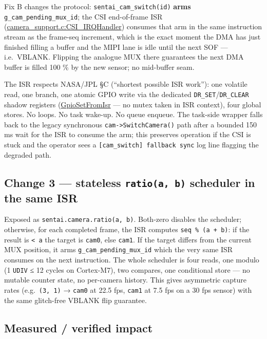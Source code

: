 Fix B changes the protocol: \texttt{sentai\_cam\_switch(id)}
\textbf{arms} \texttt{g\_cam\_pending\_mux\_id}; the CSI end-of-frame
ISR
(\href{../../../libs/camera/camera_support.c}{camera\_support.c:CSI\_IRQHandler})
consumes that arm in the same instruction stream as the frame-seq
increment, which is the exact moment the DMA has just finished filling a
buffer and the MIPI lane is idle until the next SOF --- i.e.~VBLANK.
Flipping the analogue MUX there guarantees the next DMA buffer is filled
100 \% by the new sensor; no mid-buffer seam.

The ISR respects NASA/JPL §C (``shortest possible ISR work''): one
volatile read, one branch, one atomic GPIO write via the dedicated
\texttt{DR\_SET}/\texttt{DR\_CLEAR} shadow registers
(\href{../../../libs/base/gpio.cc}{GpioSetFromIsr} --- no mutex taken in
ISR context), four global stores. No loops. No task wake-up. No queue
enqueue. The task-side wrapper falls back to the legacy synchronous
\texttt{cam-\textgreater{}SwitchCamera()} path after a bounded 150 ms
wait for the ISR to consume the arm; this preserves operation if the CSI
is stuck and the operator sees a
\texttt{{[}cam\_switch{]}\ fallback\ sync} log line flagging the
degraded path.

\subsection{\texorpdfstring{Change 3 --- stateless \texttt{ratio(a,\ b)}
scheduler in the same
ISR}{Change 3 --- stateless ratio(a, b) scheduler in the same ISR}}\label{change-3-stateless-ratioa-b-scheduler-in-the-same-isr}

Exposed as \texttt{sentai.camera.ratio(a,\ b)}. Both-zero disables the
scheduler; otherwise, for each completed frame, the ISR computes
\texttt{seq\ \%\ (a\ +\ b)}: if the result is \texttt{\textless{}\ a}
the target is \texttt{cam0}, else \texttt{cam1}. If the target differs
from the current MUX position, it arms \texttt{g\_cam\_pending\_mux\_id}
which the very same ISR consumes on the next instruction. The whole
scheduler is four reads, one modulo (1 \texttt{UDIV} ≤ 12 cycles on
Cortex-M7), two compares, one conditional store --- no mutable counter
state, no per-camera history. This gives asymmetric capture rates
(e.g.~\texttt{(3,\ 1)} → \texttt{cam0} at 22.5 fps, \texttt{cam1} at 7.5
fps on a 30 fps sensor) with the same glitch-free VBLANK flip guarantee.

\subsection{Measured / verified impact}\label{measured-verified-impact}

